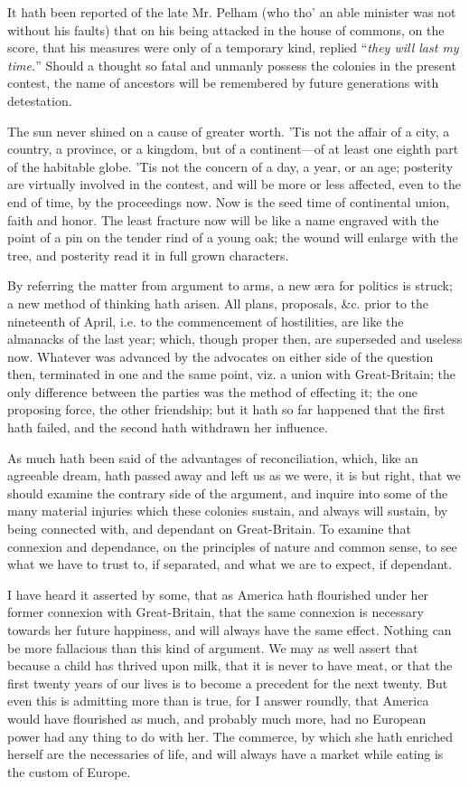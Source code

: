 \documentclass[12pt, twocolumn]{book}
\begin{document}
    It hath been reported of the late Mr. Pelham (who tho’ an able minister was not without his faults) that on his being attacked in the house of commons, on the score, that his measures were only of a temporary kind, replied “\textit{they will last my time.}” Should a thought so fatal and unmanly possess the colonies in the present contest, the name of ancestors will be remembered by future generations with detestation.

    The sun never shined on a cause of greater worth. ’Tis not the affair of a city, a country, a province, or a kingdom, but of a continent—of at least one eighth part of the habitable globe. ’Tis not the concern of a day, a year, or an age; posterity are virtually involved in the contest, and will be more or less affected, even to the end of time, by the proceedings now. Now is the seed time of continental union, faith and honor. The least fracture now will be like a name engraved with the point of a pin on the tender rind of a young oak; the wound will enlarge with the tree, and posterity read it in full grown characters.

    By referring the matter from argument to arms, a new æra for politics is struck; a new method of thinking hath arisen. All plans, proposals, \&c. prior to the nineteenth of April, i.e. to the commencement of hostilities, are like the almanacks of the last year; which, though proper then, are superseded and useless now. Whatever was advanced by the advocates on either side of the question then, terminated in one and the same point, viz. a union with Great-Britain; the only difference between the parties was the method of effecting it; the one proposing force, the other friendship; but it hath so far happened that the first hath failed, and the second hath withdrawn her influence.

    As much hath been said of the advantages of reconciliation, which, like an agreeable dream, hath passed away and left us as we were, it is but right, that we should examine the contrary side of the argument, and inquire into some of the many material injuries which these colonies sustain, and always will sustain, by being connected with, and dependant on Great-Britain. To examine that connexion and dependance, on the principles of nature and common sense, to see what we have to trust to, if separated, and what we are to expect, if dependant.

    I have heard it asserted by some, that as America hath flourished under her former connexion with Great-Britain, that the same connexion is necessary towards her future happiness, and will always have the same effect. Nothing can be more fallacious than this kind of argument. We may as well assert that because a child has thrived upon milk, that it is never to have meat, or that the first twenty years of our lives is to become a precedent for the next twenty. But even this is admitting more than is true, for I answer roundly, that America would have flourished as much, and probably much more, had no European power had any thing to do with her. The commerce, by which she hath enriched herself are the necessaries of life, and will always have a market while eating is the custom of Europe.
\end{document}
